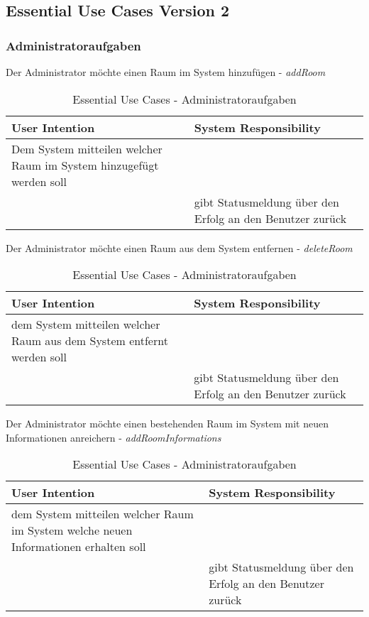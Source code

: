 \subsection{Essential Use Cases Version 2}
\label{anhang:Essential_Use_Cases_v2}

\subsubsection{Administratoraufgaben}
\begin{table}[h]
	\caption{Essential Use Cases - Administratoraufgaben}
	Der Administrator möchte einen Raum im System hinzufügen - \textit{addRoom}\\
	\begin{tabularx}{\textwidth}{|X|X|}
	\rowcolor{heading} \textbf{User Intention} & \textbf{System Responsibility}\\ \hline
	Dem System mitteilen welcher Raum im System hinzugefügt werden soll & \\
	 & gibt Statusmeldung über den Erfolg an den Benutzer zurück \\ \hline
	\end{tabularx}
	
	
	Der Administrator möchte einen Raum aus dem System entfernen - \textit{deleteRoom}\\
	\begin{tabularx}{\textwidth}{|X|X|}
	\rowcolor{heading} \textbf{User Intention} & \textbf{System Responsibility}\\ \hline
	dem System mitteilen welcher Raum aus dem System entfernt werden soll & \\
	 & gibt Statusmeldung über den Erfolg an den Benutzer zurück \\ \hline
	\end{tabularx}
	
	
	Der Administrator möchte einen bestehenden Raum im System mit neuen Informationen anreichern - \textit{addRoomInformations}\\
	\begin{tabularx}{\textwidth}{|X|X|}
	\rowcolor{heading} \textbf{User Intention} & \textbf{System Responsibility}\\ \hline
	dem System mitteilen welcher Raum im System welche neuen Informationen erhalten soll & \\
	 & gibt Statusmeldung über den Erfolg an den Benutzer zurück \\ \hline
	\end{tabularx}



\end{table}
